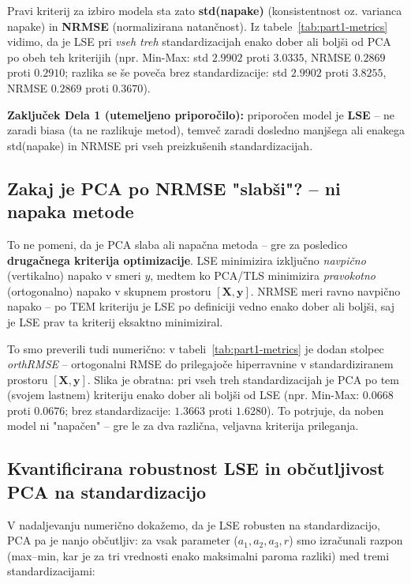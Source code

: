 \documentclass[a4paper, 11pt]{article}
\begin{document}
Pravi kriterij za izbiro modela sta zato \textbf{std(napake)} (konsistentnost oz. varianca
napake) in \textbf{NRMSE} (normalizirana natančnost). Iz tabele~\ref{tab:part1-metrics}
vidimo, da je LSE pri \emph{vseh treh} standardizacijah enako dober ali boljši od PCA po
obeh teh kriterijih (npr. Min-Max: std $2.9902$ proti $3.0335$, NRMSE $0.2869$ proti
$0.2910$; razlika se še poveča brez standardizacije: std $2.9902$ proti $3.8255$, NRMSE
$0.2869$ proti $0.3670$).

\textbf{Zaključek Dela 1 (utemeljeno priporočilo):} priporočen model je \textbf{LSE} --
ne zaradi biasa (ta ne razlikuje metod), temveč zaradi dosledno manjšega ali enakega
std(napake) in NRMSE pri vseh preizkušenih standardizacijah.

\subsection{Zakaj je PCA po NRMSE "slabši"? -- ni napaka metode}

To ne pomeni, da je PCA slaba ali napačna metoda -- gre za posledico \textbf{drugačnega
kriterija optimizacije}. LSE minimizira izključno \emph{navpično} (vertikalno) napako v
smeri $y$, medtem ko PCA/TLS minimizira \emph{pravokotno} (ortogonalno) napako v skupnem
prostoru $[\mathbf{X},\mathbf{y}]$. NRMSE meri ravno navpično napako -- po TEM kriteriju
je LSE po definiciji vedno enako dober ali boljši, saj je LSE prav ta kriterij eksaktno
minimiziral.

To smo preverili tudi numerično: v tabeli~\ref{tab:part1-metrics} je dodan stolpec
\emph{orthRMSE} -- ortogonalni RMSE do prilegajoče hiperravnine v standardiziranem
prostoru $[\mathbf{X},\mathbf{y}]$. Slika je obratna: pri vseh treh standardizacijah je
PCA po tem (svojem lastnem) kriteriju enako dober ali boljši od LSE (npr. Min-Max:
$0.0668$ proti $0.0676$; brez standardizacije: $1.3663$ proti $1.6280$). To potrjuje, da
noben model ni "napačen" -- gre le za dva različna, veljavna kriterija prileganja.

\subsection{Kvantificirana robustnost LSE in občutljivost PCA na standardizacijo}
\label{sec:robustnost}

V nadaljevanju numerično dokažemo, da je LSE robusten na standardizacijo, PCA pa je
nanjo občutljiv: za vsak parameter ($a_1,a_2,a_3,r$) smo izračunali razpon (max--min, kar je za tri vrednosti
enako maksimalni paroma razliki) med tremi standardizacijami:
\end{document}
